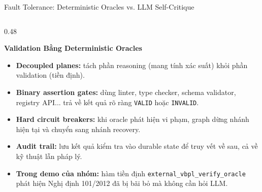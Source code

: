 \documentclass[aspectratio=1610,10pt,xcolor={table}]{beamer}
\begin{document}
\begin{frame}{Fault Tolerance: Deterministic Oracles vs. LLM Self-Critique}
\begin{columns}[t]
    \begin{column}{0.48\textwidth}
      \begin{block}{\textbf{Validation Bằng Deterministic Oracles}}
        \scriptsize
        \begin{itemize}
          \item \textbf{Decoupled planes:} tách phần reasoning (mang tính xác suất) khỏi phần validation (tiền định).
          \item \textbf{Binary assertion gates:} dùng linter, type checker, schema validator, registry API... trả về kết quả rõ ràng \texttt{VALID} hoặc \texttt{INVALID}.
          \item \textbf{Hard circuit breakers:} khi oracle phát hiện vi phạm, graph dừng nhánh hiện tại và chuyển sang nhánh recovery.
          \item \textbf{Audit trail:} lưu kết quả kiểm tra vào durable state để truy vết về sau, cả về kỹ thuật lẫn pháp lý.
          \item \textbf{Trong demo của nhóm:} hàm tiền định \texttt{external\_vbpl\_verify\_oracle} phát hiện Nghị định 101/2012 đã bị bãi bỏ mà không cần hỏi LLM.
        \end{itemize}
      \end{block}
    \end{column}
  \end{columns}
\end{frame}
\end{document}
